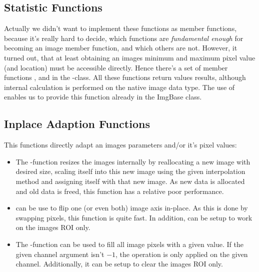 \subsection{Statistic Functions}
Actually we didn't want to implement these functions as member functions, because it's really hard to decide, which functions are \emph{fundamental enough} for becoming an image member function, and which others are not. However, it turned out, that at least obtaining an images minimum and maximum pixel value (and location) must be accessible directly. Hence there's a set of member functions ,  and  in the -class. All these functions return  values results, although internal calculation is performed on the native image data type. The use of  enables us to provide this function already in the ImgBase class.

\subsection{Inplace Adaption Functions}
This functions directly adapt an images parameters and/or it's pixel values:
\begin{itemize}
\item The -function resizes the images internally by reallocating a new image with desired size, scaling itself into this new image using the given interpolation method and assigning itself with that new image. As new data is allocated and old data is freed, this function has a relative poor performance.
\item {} can be use to flip one (or even both) image axis in-place. As this is done by swapping pixels, this function is quite fast. In addition,  can be setup to work on the images ROI only.
\item The -function can be used to fill all image pixels with a given value. If the given channel argument isn't $-1$, the operation is only applied on the given channel. Additionally, it can be setup to clear the images ROI only.
\end{itemize}

